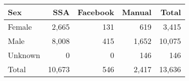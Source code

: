 
\begin{tabular}{lrrrr}
\toprule
Sex & SSA & Facebook & Manual & Total\\
\midrule
Female & 2,665 & 131 & 619 & 3,415\\
Male & 8,008 & 415 & 1,652 & 10,075\\
Unknown & 0 & 0 & 146 & 146\\
\midrule
Total & 10,673 & 546 & 2,417 & 13,636\\
\bottomrule
\end{tabular}
